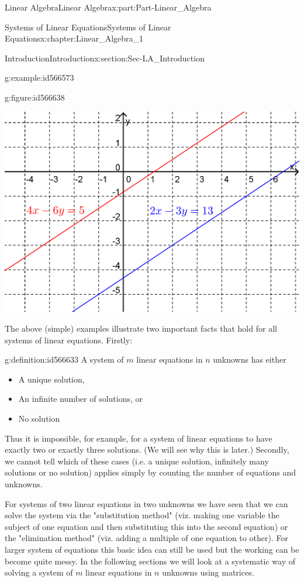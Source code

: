 \documentclass[oneside,10pt,]{book}
\numberwithin{equation}{section}
\begin{document}
\begin{partptx}{Linear Algebra}{}{Linear Algebra}{}{}{x:part:Part-Linear_Algebra}
\begin{chapterptx}{Systems of Linear Equations}{}{Systems of Linear Equations}{}{}{x:chapter:Linear_Algebra_1}
\begin{sectionptx}{Introduction}{}{Introduction}{}{}{x:section:Sec-LA_Introduction}
\begin{example}{}{g:example:id566573}
\begin{figureptx}{}{g:figure:id566638}{}
\begin{image}{0.2}{0.6}{0.2}%
\includegraphics[width=\linewidth]{./LinearAlgebra/Images/1/figure3.png}
\end{image}%
\tcblower
\end{figureptx}%
%
\end{example}
The above (simple) examples illustrate two important facts that hold for all systems of linear equations. Firstly:%
\begin{definition}{}{g:definition:id566633}%
A system of \(m\) linear equations in \(n\) unknowns has either%
\par
%
\begin{itemize}[label=\textbullet]
\item{}A unique solution,%
\item{}An infinite number of solutions, or%
\item{}No solution%
\end{itemize}
%
\end{definition}
Thus it is impossible, for example, for a system of linear equations to have exactly two or exactly three solutions. (We will see why this is later.) Secondly, we cannot tell which of these cases (i.e. a unique solution, infinitely many solutions or no solution) applies simply by counting the number of equations and unknowns.%
\par
For systems of two linear equations in two unknowns we have seen that we can solve the system via the "substitution method" (viz. making one variable the subject of one equation and then substituting this into the second equation) or the "elimination method" (viz. adding a multiple of one equation to other). For larger system of equations this basic idea can still be used but the working can be become quite messy. In the following sections we will look at a systematic way of solving a system of \(m\) linear equations in \(n\) unknowns using matrices.%

\end{sectionptx}
\end{chapterptx}
\end{partptx}
\end{document}
